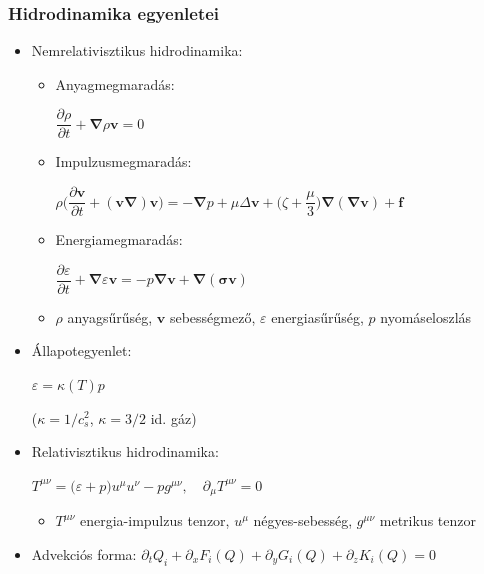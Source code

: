 \documentclass{beamer}
\begin{document}
\begin{frame}
\frametitle{Hidrodinamika egyenletei}
\begin{itemize}
\item<1-> Nemrelativisztikus hidrodinamika:
\begin{itemize}
\item<1-> Anyagmegmaradás:\quad \begin{large}$\dfrac{\partial \rho}{\partial t} + \bm{\nabla}\rho\bm{v}=0$\end{large}
\item<1-> Impulzusmegmaradás:\quad \begin{center}\begin{large}$\rho\Big(\dfrac{\partial \bm{v}}{\partial t}+(\bm{v\nabla})\bm{v}\Big)=-\bm{\nabla}p +\mu\Delta\bm{v}+\Big(\zeta+\dfrac{\mu}{3}\Big)\bm{\nabla}(\bm{\nabla v})+\bm{f}$\end{large}\end{center}
\item<1-> Energiamegmaradás: \quad\begin{large}$\dfrac{\partial \varepsilon}{\partial t}+\bm{\nabla}\varepsilon\bm{v}=-p\bm{\nabla v}+\bm{\nabla(\sigma v)}$\end{large}
\item<1-> $\rho$ anyagsűrűség, $\bm{v}$ sebességmező, $\varepsilon$ energiasűrűség, $p$ nyomáseloszlás
\end{itemize}


\item<2-> Állapotegyenlet:\quad \begin{large}$\varepsilon=\kappa(T)p\quad$\end{large} ($\kappa=1/c_s^2$, $\kappa=3/2$ id. gáz)

\item<3-> Relativisztikus hidrodinamika:
\begin{Large}
\begin{center}$T^{\mu\nu}=\big(\varepsilon+p\big)u^\mu u^\nu-pg^{\mu\nu},\quad \partial_\mu T^{\mu\nu}=0$\end{center}
\end{Large}
\begin{itemize}
\item<3-> $T^{\mu\nu}$ energia-impulzus tenzor, $u^\mu$ négyes-sebesség, $g^{\mu\nu}$ metrikus tenzor
\end{itemize}
\item<3-> Advekciós forma: $\partial_t Q_i+\partial_x F_i(Q)+\partial_y G_i(Q)+\partial_z K_i(Q)=0$

\end{itemize}
\end{frame}
\end{document}
